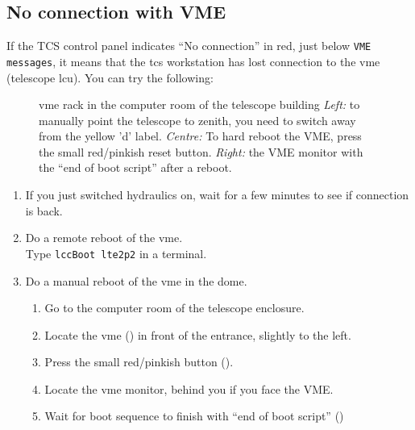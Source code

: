 \documentclass[11pt,fleqn,a4paper]{book}
\begin{document}
\subsection{No connection with VME}
If the \gls{TCS control panel} indicates ``No connection'' in red, just below \texttt{VME messages}, it means that the \gls{tcs} workstation has lost connection to the \gls{vme} (telescope \gls{lcu}). You can try the following:

\begin{figure}
\centering
{}%
\caption[VME rack in the computer room of the telescope building]{\gls{vme} rack in the \gls{computer room} of the telescope building 
\emph{Left:} to
manually point the telescope to zenith, you need to switch away from 
the yellow 'd' label. \emph{Centre:} To hard reboot the VME, press the small red/pinkish reset button. \emph{Right:} the VME monitor with the ``end of boot script'' after a reboot.}
\end{figure}

\begin{enumerate}
    \item If you just switched hydraulics on, wait for a few minutes to see
        if connection is back.
    \item Do a remote reboot of the \gls{vme}.\\
          Type \texttt{\gls{lccBoot} \gls{lte2p2}} in a terminal.
    \item Do a manual reboot of the \gls{vme} in the dome.
    \begin{enumerate}
        \item Go to the \gls{computer room} of the telescope enclosure.
        \item Locate the \gls{vme} () in front of the entrance, slightly to the left.
        \item Press the small red/pinkish button ().
        \item Locate the \gls{vme} monitor, behind you if you face the VME.
        \item Wait for boot sequence to finish with ``end of boot script'' ()
    \end{enumerate}
\end{enumerate}
\end{document}
